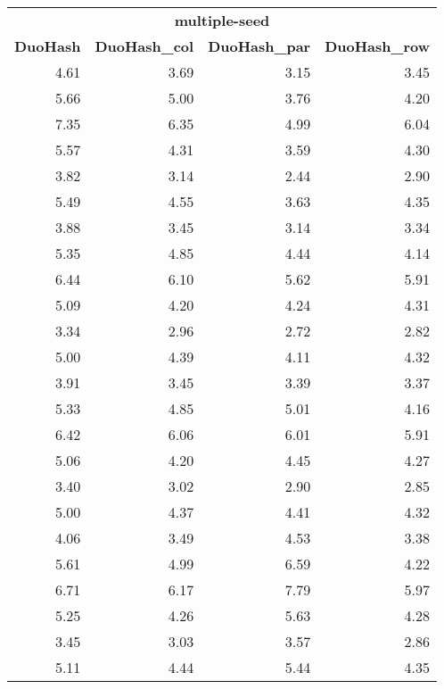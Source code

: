\section*{\phantom{A}}
\begin{table}[!ht]
	\begin{tabular}{rrrr}
		\multicolumn{4}{c}{\textbf{multiple-seed}} \\
		\textbf{DuoHash} & \textbf{DuoHash\_col} & \textbf{DuoHash\_par} & \textbf{DuoHash\_row} \\
		\toprule
		4.61 & 3.69 & 3.15 & 3.45 \\
		5.66 & 5.00 & 3.76 & 4.20 \\
		7.35 & 6.35 & 4.99 & 6.04 \\
		5.57 & 4.31 & 3.59 & 4.30 \\
		3.82 & 3.14 & 2.44 & 2.90 \\
		5.49 & 4.55 & 3.63 & 4.35 \\
		\midrule
		3.88 & 3.45 & 3.14 & 3.34 \\
		5.35 & 4.85 & 4.44 & 4.14 \\
		6.44 & 6.10 & 5.62 & 5.91 \\
		5.09 & 4.20 & 4.24 & 4.31 \\
		3.34 & 2.96 & 2.72 & 2.82 \\
		5.00 & 4.39 & 4.11 & 4.32 \\
		\midrule
		3.91 & 3.45 & 3.39 & 3.37 \\
		5.33 & 4.85 & 5.01 & 4.16 \\
		6.42 & 6.06 & 6.01 & 5.91 \\
		5.06 & 4.20 & 4.45 & 4.27 \\
		3.40 & 3.02 & 2.90 & 2.85 \\
		5.00 & 4.37 & 4.41 & 4.32 \\
		\midrule
		4.06 & 3.49 & 4.53 & 3.38 \\
		5.61 & 4.99 & 6.59 & 4.22 \\
		6.71 & 6.17 & 7.79 & 5.97 \\
		5.25 & 4.26 & 5.63 & 4.28 \\
		3.45 & 3.03 & 3.57 & 2.86 \\
		5.11 & 4.44 & 5.44 & 4.35 \\
		\bottomrule
	\end{tabular}
\end{table}
